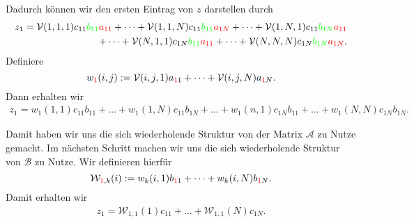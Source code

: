 Dadurch können wir den ersten Eintrag von $z$ darstellen durch
\begin{equation*} \label{eq:zold}
\begin{aligned}
z_{1} = \mathcal{V}(1,1,1) c_{11} \textcolor{green}{b_{11}} \textcolor{red}{a_{11}}+ \dots +  \mathcal{V}(1,1,N) c_{11} \textcolor{green}{b_{11}} \textcolor{red}{a_{1N}} + \dots  +  \mathcal{V}(1,N,1)c_{11} 
\textcolor{green}{b_{1N}} \textcolor{red}{a_{11}} \\ + \dots +  \mathcal{V}(N,1,1) c_{1N} \textcolor{green}{b_{11}} \textcolor{red}{a_{11}} + \dots +  \mathcal{V}(N,N,N) c_{1N} \textcolor{green}{b_{1N}} \textcolor{red}{a_{1N}}.
\end{aligned}
\end{equation*}
Definiere $$w_{\textcolor{red}{1}}(i,j) :=\mathcal{V}(i,j,1) a_{\textcolor{red}{1}1}+\dots+\mathcal{V}(i,j,N) a_{\textcolor{red}{1}N}.$$ Dann erhalten wir
\begin{equation*}
\begin{aligned}
z_{1}= w_1(1,1) c_{11} b_{11} + \dots +   w_1(1,N) c_{11} b_{1N} + \dots + w_1(n,1) c_{1N} b_{11}  + \dots +  w_1(N,N) c_{1N} b_{1N}.
\end{aligned}
\end{equation*}

Damit haben wir uns die sich wiederholende Struktur von der Matrix $\mathcal{A}$ zu Nutze gemacht. Im nächsten Schritt machen wir uns die sich wiederholende Struktur von $\mathcal{B}$ zu Nutze.
Wir definieren hierfür $$\mathcal{W}_{\textcolor{red}{1},k} (i):= w_k(i,1) b_{\textcolor{red}{1}1} + \dots + w_k(i,N) b_{\textcolor{red}{1}N}.$$ Damit erhalten wir
\begin{equation*} \label{eq:znew}
\begin{aligned}
z_{1}= \mathcal{W}_{1,1}(1) c_{11}  + \dots +  \mathcal{W}_{1,1}(N) c_{1N}.
\end{aligned}
\end{equation*}

